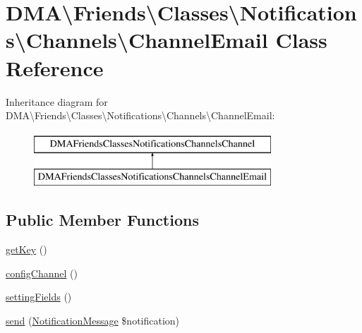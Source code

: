 \hypertarget{classDMA_1_1Friends_1_1Classes_1_1Notifications_1_1Channels_1_1ChannelEmail}{\section{D\-M\-A\textbackslash{}Friends\textbackslash{}Classes\textbackslash{}Notifications\textbackslash{}Channels\textbackslash{}Channel\-Email Class Reference}
\label{classDMA_1_1Friends_1_1Classes_1_1Notifications_1_1Channels_1_1ChannelEmail}
}
Inheritance diagram for D\-M\-A\textbackslash{}Friends\textbackslash{}Classes\textbackslash{}Notifications\textbackslash{}Channels\textbackslash{}Channel\-Email\-:\begin{figure}[H]
\begin{center}
\leavevmode
\includegraphics[height=2.000000cm]{dd/d1a/classDMA_1_1Friends_1_1Classes_1_1Notifications_1_1Channels_1_1ChannelEmail}
\end{center}
\end{figure}
\subsection*{Public Member Functions}
\begin{DoxyCompactItemize}
\item 
\hyperlink{classDMA_1_1Friends_1_1Classes_1_1Notifications_1_1Channels_1_1ChannelEmail_afeeb39b1455f8f0dc5981dea1354cf9b}{get\-Key} ()
\item 
\hyperlink{classDMA_1_1Friends_1_1Classes_1_1Notifications_1_1Channels_1_1ChannelEmail_aa1435fd7c5b6aa3119cbaedf08277275}{config\-Channel} ()
\item 
\hyperlink{classDMA_1_1Friends_1_1Classes_1_1Notifications_1_1Channels_1_1ChannelEmail_a5e2c8c7c67de35cd99f5cdd9b4cc31cd}{setting\-Fields} ()
\item 
\hyperlink{classDMA_1_1Friends_1_1Classes_1_1Notifications_1_1Channels_1_1ChannelEmail_a92161c6ed146cfef431ae1deafd0d751}{send} (\hyperlink{classDMA_1_1Friends_1_1Classes_1_1Notifications_1_1NotificationMessage}{Notification\-Message} \$notification)
\end{DoxyCompactItemize}


